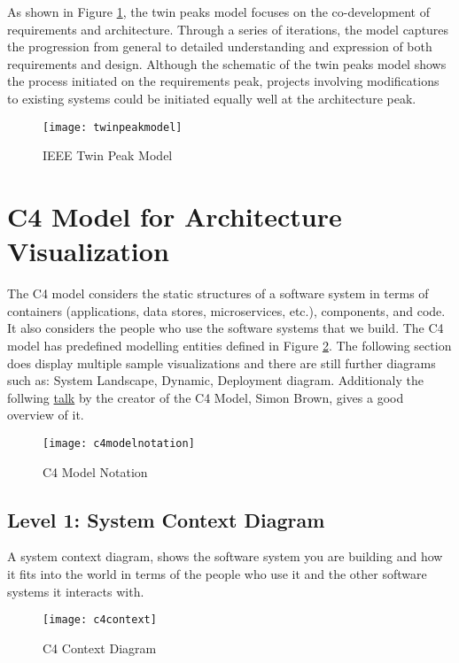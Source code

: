 As shown in Figure \ref{fig:twinpeakmodel}, the twin peaks model focuses on the co-development of requirements and architecture. Through a series of iterations, the model captures the progression from general to detailed understanding and expression of both requirements and design. Although the schematic of the twin peaks model shows the process initiated on the requirements peak, projects involving modifications to existing systems could be initiated equally well at the architecture peak.

\begin{figure}[h!]
  \center
  \texttt{[image: twinpeakmodel]}
  \caption{IEEE Twin Peak Model}
  \label{fig:twinpeakmodel}
\end{figure}

\section{C4 Model for Architecture Visualization}
The C4 model considers the static structures of a software system in terms of containers (applications, data stores, microservices, etc.), components, and code. It also considers the people who use the software systems that we build. The C4 model has predefined modelling entities defined in Figure \ref{fig:c4modelnotation}. The following section does display multiple sample visualizations and there are still further diagrams such as: System Landscape, Dynamic, Deployment diagram. Additionaly the follwing \href{https://www.youtube.com/watch?v=x2-rSnhpw0g}{talk} by the creator of the C4 Model, Simon Brown, gives a good overview of it.

\begin{figure}[H]
  \center
  \texttt{[image: c4modelnotation]}
  \caption{C4 Model Notation}
  \label{fig:c4modelnotation}
\end{figure}

\subsection{Level 1: System Context Diagram}
A system context diagram, shows the software system you are building and how it fits into the world in terms of the people who use it and the other software systems it interacts with.

\begin{figure}[H]
  \center
  \texttt{[image: c4context]}
  \caption{C4 Context Diagram}
\end{figure}

